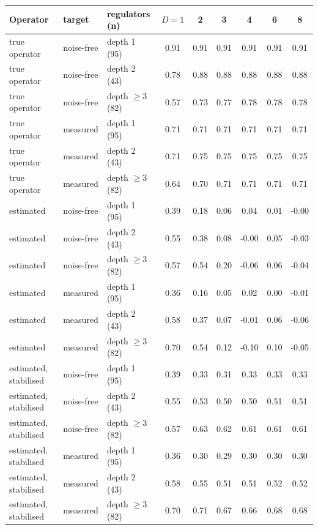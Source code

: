 \begin{tabular}{lllcccccc}
\toprule
Operator & target & regulators (n) & $D{=}1$ & 2 & 3 & 4 & 6 & 8 \\
\midrule
true operator & noise-free & depth 1 (95) & 0.91 & 0.91 & 0.91 & 0.91 & 0.91 & 0.91 \\
true operator & noise-free & depth 2 (43) & 0.78 & 0.88 & 0.88 & 0.88 & 0.88 & 0.88 \\
true operator & noise-free & depth $\ge3$ (82) & 0.57 & 0.73 & 0.77 & 0.78 & 0.78 & 0.78 \\
true operator & measured & depth 1 (95) & 0.71 & 0.71 & 0.71 & 0.71 & 0.71 & 0.71 \\
true operator & measured & depth 2 (43) & 0.71 & 0.75 & 0.75 & 0.75 & 0.75 & 0.75 \\
true operator & measured & depth $\ge3$ (82) & 0.64 & 0.70 & 0.71 & 0.71 & 0.71 & 0.71 \\
estimated & noise-free & depth 1 (95) & 0.39 & 0.18 & 0.06 & 0.04 & 0.01 & -0.00 \\
estimated & noise-free & depth 2 (43) & 0.55 & 0.38 & 0.08 & -0.00 & 0.05 & -0.03 \\
estimated & noise-free & depth $\ge3$ (82) & 0.57 & 0.54 & 0.20 & -0.06 & 0.06 & -0.04 \\
estimated & measured & depth 1 (95) & 0.36 & 0.16 & 0.05 & 0.02 & 0.00 & -0.01 \\
estimated & measured & depth 2 (43) & 0.58 & 0.37 & 0.07 & -0.01 & 0.06 & -0.06 \\
estimated & measured & depth $\ge3$ (82) & 0.70 & 0.54 & 0.12 & -0.10 & 0.10 & -0.05 \\
estimated, stabilised & noise-free & depth 1 (95) & 0.39 & 0.33 & 0.31 & 0.33 & 0.33 & 0.33 \\
estimated, stabilised & noise-free & depth 2 (43) & 0.55 & 0.53 & 0.50 & 0.50 & 0.51 & 0.51 \\
estimated, stabilised & noise-free & depth $\ge3$ (82) & 0.57 & 0.63 & 0.62 & 0.61 & 0.61 & 0.61 \\
estimated, stabilised & measured & depth 1 (95) & 0.36 & 0.30 & 0.29 & 0.30 & 0.30 & 0.30 \\
estimated, stabilised & measured & depth 2 (43) & 0.58 & 0.55 & 0.51 & 0.51 & 0.52 & 0.52 \\
estimated, stabilised & measured & depth $\ge3$ (82) & 0.70 & 0.71 & 0.67 & 0.66 & 0.68 & 0.68 \\
\bottomrule
\end{tabular}
